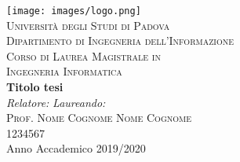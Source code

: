 



\begin{titlepage}
\begin{center}
\texttt{[image: images/logo.png]}\\

\vspace{0.8cm}
\textsc{\LARGE Universit\`{a} degli Studi di Padova}\\
\vspace{0.45cm}
\textsc{\large Dipartimento di Ingegneria dell'Informazione}\\
\vspace{0.4cm}
\textsc{\large Corso di Laurea Magistrale in}\\
\textsc{\large Ingegneria Informatica}\\
\vfill
{ \LARGE \bfseries Titolo tesi
}\\
\vfill
\textit{\large Relatore:} \hfill \textit{\large Laureando:}\\
\textsc{\large Prof. Nome Cognome} \hfill \textsc{Nome Cognome}\\
\hfill \textsc{1234567}\\

\vfill
{\large Anno Accademico 2019/2020}
\end{center}
\end{titlepage}



